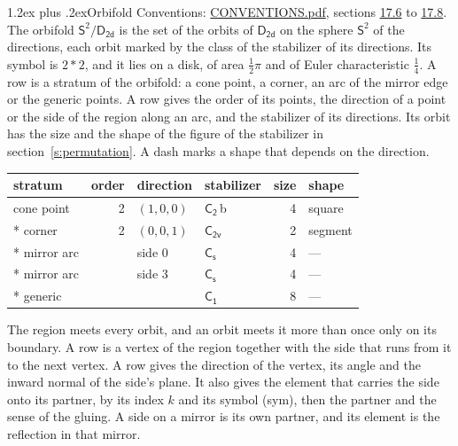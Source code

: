 \documentclass[10pt,a4paper]{article}
\makeatletter
\renewcommand\section{\@startsection{section}{1}{\z@}{-3ex plus -1ex minus -.2ex}%
  {1.2ex plus .2ex}{\normalfont\large\sffamily\bfseries\color{parttitle}}}
\numberwithin{equation}{section}
\newcommand{\grp}[1]{\mathsf{#1}}
\newcommand{\orbname}[1]{#1}
\newcommand{\clsletter}[1]{\,{\scriptsize\color{black!55}#1}}
\newcommand{\dirvec}[3]{(#1, #2, #3)}
\newcommand{\twosphere}{\mathsf{S}^{2}}
\makeatother
\begin{document}
\section{Orbifold}\label{s:orbifold}
Conventions: \href{../../CONVENTIONS.pdf}{CONVENTIONS.pdf}, sections \href{../../CONVENTIONS.pdf\#conv.17.6}{17.6} to \href{../../CONVENTIONS.pdf\#conv.17.8}{17.8}.
The orbifold $\twosphere/\grp{D_{2d}}$ is the set of the orbits of $\grp{D_{2d}}$ on the sphere $\twosphere$ of the directions, each orbit marked by the class of the stabilizer of its directions. Its symbol is $\orbname{2{\ast}2}$, and it lies on a disk, of area $\tfrac{1}{2}\pi$ and of Euler characteristic $\tfrac{1}{4}$.
\leavevmode\label{n:head.stratum}\label{n:head.order.point}\label{n:head.direction}\label{n:head.stabilizer}\label{n:head.size.orbit}\label{n:head.shape}A row is a stratum of the orbifold: a cone point, a corner, an arc of the mirror edge or the generic points. A row gives the order of its points, the direction of a point or the side of the region along an arc, and the stabilizer of its directions. Its orbit has the size and the shape of the figure of the stabilizer in section~\ref{s:permutation}. A dash marks a shape that depends on the direction.
{\small\setlength{\tabcolsep}{4pt}\begin{longtable}{@{}lrllrl@{}}\toprule
stratum & order & direction & stabilizer & size & shape\\\midrule\endhead
\bottomrule\endfoot\endlastfoot
cone point & 2 & $\dirvec{1}{0}{0}$ & \href{C2.pdf}{$\grp{C_{2}}$}\clsletter{b} & 4 & square\\*
corner & 2 & $\dirvec{0}{0}{1}$ & \href{C2v.pdf}{$\grp{C_{2v}}$} & 2 & segment\\*
mirror arc &  & side 0 & \href{C1v.pdf}{$\grp{C_{s}}$} & 4 & ---\\*
mirror arc &  & side 3 & \href{C1v.pdf}{$\grp{C_{s}}$} & 4 & ---\\*
generic &  &  & \href{C1.pdf}{$\grp{C_{1}}$} & 8 & ---\\
\bottomrule\end{longtable}}
\leavevmode\label{n:head.vertex.region}\label{n:head.angle}\label{n:head.normal.side}\label{n:head.partner}\label{n:head.sense}The region meets every orbit, and an orbit meets it more than once only on its boundary. A row is a vertex of the region together with the side that runs from it to the next vertex. A row gives the direction of the vertex, its angle and the inward normal of the side's plane. It also gives the element that carries the side onto its partner, by its index $k$ and its symbol (sym), then the partner and the sense of the gluing. A side on a mirror is its own partner, and its element is the reflection in that mirror.
\end{document}
